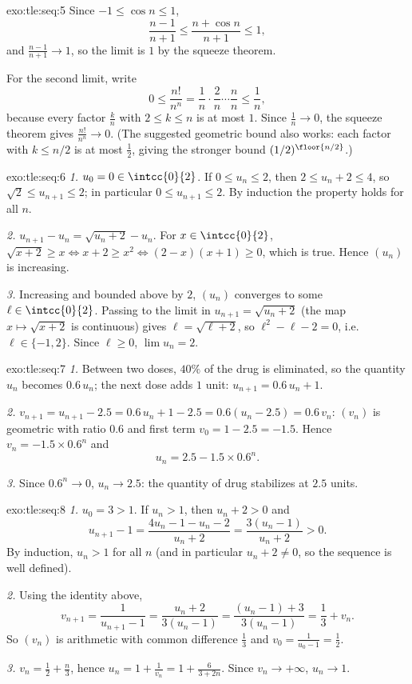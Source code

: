 \begin{solution}{exo:tle:seq:5}
Since $-1 \leq \cos n \leq 1$,
\[
\frac{n-1}{n+1} \leq \frac{n + \cos n}{n+1} \leq 1,
\]
and $\frac{n-1}{n+1} \to 1$, so the limit is $1$ by the squeeze theorem.

For the second limit, write
\[
0 \leq \frac{n!}{n^n}
= \frac{1}{n}\cdot\frac{2}{n}\cdots\frac{n}{n}
\leq \frac{1}{n},
\]
because every factor $\frac{k}{n}$ with $2 \leq k \leq n$ is at most $1$.
Since $\frac1n \to 0$, the squeeze theorem gives $\frac{n!}{n^n} \to 0$. (The
suggested geometric bound also works: each factor with $k \leq n/2$ is at most
$\frac12$, giving the stronger bound $(1/2)^{\floor{n/2}}$.)
\end{solution}

\begin{solution}{exo:tle:seq:6}
\emph{1.} $u_0 = 0 \in \intcc{0}{2}$. If $0 \leq u_n \leq 2$, then
$2 \leq u_n + 2 \leq 4$, so $\sqrt{2} \leq u_{n+1} \leq 2$; in particular
$0 \leq u_{n+1} \leq 2$. By induction the property holds for all $n$.

\emph{2.} $u_{n+1} - u_n = \sqrt{u_n + 2} - u_n$. For $x \in \intcc{0}{2}$,
$\sqrt{x+2} \geq x \iff x + 2 \geq x^2 \iff (2-x)(x+1) \geq 0$, which is true.
Hence $(u_n)$ is increasing.

\emph{3.} Increasing and bounded above by $2$, $(u_n)$ converges to some
$\ell \in \intcc{0}{2}$. Passing to the limit in $u_{n+1} = \sqrt{u_n + 2}$
(the map $x \mapsto \sqrt{x+2}$ is continuous) gives $\ell = \sqrt{\ell + 2}$,
so $\ell^2 - \ell - 2 = 0$, i.e.\ $\ell \in \{-1, 2\}$. Since $\ell \geq 0$,
$\lim u_n = 2$.
\end{solution}

\begin{solution}{exo:tle:seq:7}
\emph{1.} Between two doses, $40\%$ of the drug is eliminated, so the
quantity $u_n$ becomes $0.6\,u_n$; the next dose adds $1$ unit:
$u_{n+1} = 0.6\,u_n + 1$.

\emph{2.} $v_{n+1} = u_{n+1} - 2.5 = 0.6\,u_n + 1 - 2.5 = 0.6(u_n - 2.5)
= 0.6\,v_n$: $(v_n)$ is geometric with ratio $0.6$ and first term
$v_0 = 1 - 2.5 = -1.5$. Hence $v_n = -1.5 \times 0.6^n$ and
\[
u_n = 2.5 - 1.5 \times 0.6^n .
\]

\emph{3.} Since $0.6^n \to 0$, $u_n \to 2.5$: the quantity of drug stabilizes
at $2.5$ units.
\end{solution}

\begin{solution}{exo:tle:seq:8}
\emph{1.} $u_0 = 3 > 1$. If $u_n > 1$, then $u_n + 2 > 0$ and
\[
u_{n+1} - 1 = \frac{4u_n - 1 - u_n - 2}{u_n + 2} = \frac{3(u_n - 1)}{u_n + 2} > 0 .
\]
By induction, $u_n > 1$ for all $n$ (and in particular $u_n + 2 \neq 0$, so
the sequence is well defined).

\emph{2.} Using the identity above,
\[
v_{n+1} = \frac{1}{u_{n+1} - 1} = \frac{u_n + 2}{3(u_n - 1)}
= \frac{(u_n - 1) + 3}{3(u_n - 1)} = \frac{1}{3} + v_n .
\]
So $(v_n)$ is arithmetic with common difference $\frac13$ and
$v_0 = \frac{1}{u_0 - 1} = \frac12$.

\emph{3.} $v_n = \frac12 + \frac{n}{3}$, hence
$u_n = 1 + \frac{1}{v_n} = 1 + \frac{6}{3 + 2n}$. Since $v_n \to +\infty$,
$u_n \to 1$.
\end{solution}


